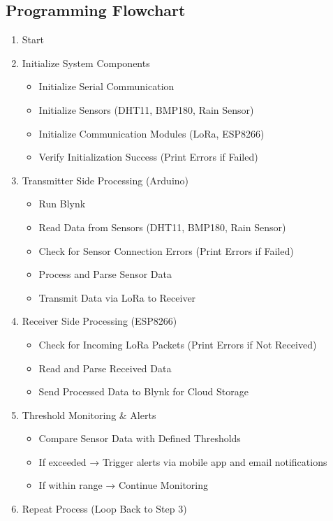 \documentclass[conference, onecolumn]{IEEEtran}
\begin{document}
\subsection{Programming Flowchart}
\begin{enumerate}
    \item Start
    \item Initialize System Components
    \begin{itemize}
        \item Initialize Serial Communication
        \item Initialize Sensors (DHT11, BMP180, Rain Sensor)
        \item Initialize Communication Modules (LoRa, ESP8266)
        \item Verify Initialization Success (Print Errors if Failed)
    \end{itemize}
    \item Transmitter Side Processing (Arduino)
    \begin{itemize}
        \item Run Blynk
        \item Read Data from Sensors (DHT11, BMP180, Rain Sensor)
        \item Check for Sensor Connection Errors (Print Errors if Failed)
        \item Process and Parse Sensor Data
        \item Transmit Data via LoRa to Receiver
    \end{itemize}
    \item Receiver Side Processing (ESP8266)
    \begin{itemize}
        \item Check for Incoming LoRa Packets (Print Errors if Not Received)
        \item Read and Parse Received Data
        \item Send Processed Data to Blynk for Cloud Storage
    \end{itemize}
    \item Threshold Monitoring \& Alerts
    \begin{itemize}
        \item Compare Sensor Data with Defined Thresholds
        \item If exceeded → Trigger alerts via mobile app and email notifications
        \item If within range → Continue Monitoring
    \end{itemize}
    \item Repeat Process (Loop Back to Step 3)
\end{enumerate}
\end{document}
